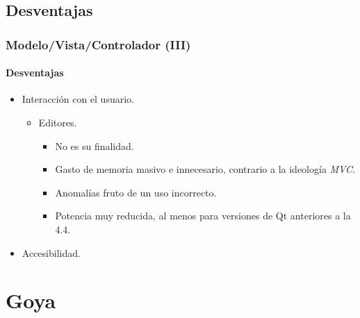 \documentclass[12pt]{beamer}
\begin{document}
\subsection{Desventajas}
\begin{frame}
  \frametitle{Modelo/Vista/Controlador (III)}
  \framesubtitle{Desventajas}

  \begin{block}{}
    \begin{itemize}
      \item Interacción con el usuario.
        \begin{itemize}
            \item Editores.
            \begin{itemize}
              \item \alert{No} es su finalidad.
              \medskip
              \pause
              \item Gasto de memoria masivo e innecesario, contrario a la ideología \emph{MVC}.
              \medskip
              \pause
              \item Anomalías fruto de un uso incorrecto.
              \medskip
              \pause
              \item Potencia muy reducida, al menos para versiones de Qt anteriores a la 4.4.
            \end{itemize}
        \end{itemize}
      \medskip
      \pause
      \item Accesibilidad.
    \end{itemize}
  \end{block}

\end{frame}

\section{Goya}
\end{document}
